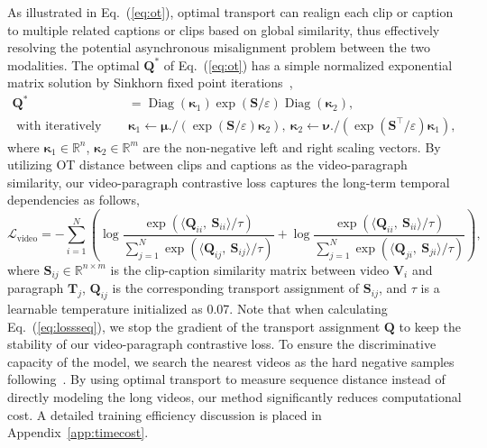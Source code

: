 As illustrated in Eq.~(\ref{eq:ot}), optimal transport can realign each clip or caption to multiple related captions or clips based on global similarity, thus effectively resolving the potential asynchronous misalignment problem between the two modalities. The optimal $\mathbf{Q}^*$ of Eq.~(\ref{eq:ot}) has a simple normalized exponential matrix solution by Sinkhorn fixed point iterations~\citep{sinkhorn}, 
\begin{equation}
\begin{aligned}
	  \mathbf{Q}^* & =  \operatorname{Diag}(\boldsymbol{\kappa}_1) \exp \left({ \mathbf{S}}/{\varepsilon}\right) \operatorname{Diag}(\boldsymbol{\kappa}_2),\\
\text{  with iteratively updated}~&
\boldsymbol{\kappa}_1 \leftarrow \boldsymbol{\mu} . /\left(\exp\left({ {\mathbf{S}}}/{\varepsilon}\right)\boldsymbol{\kappa}_2\right),  ~
\boldsymbol{\kappa}_2 \leftarrow \boldsymbol{\nu} . /\left(\exp\left({\mathbf{S}^{\top}}/{\varepsilon}\right) \boldsymbol{\kappa}_1\right),
\end{aligned}
  \label{eq:q_ot}
\end{equation}
where $\boldsymbol{\kappa}_1 \in \mathbb{R}^n$, $\boldsymbol{\kappa}_2 \in \mathbb{R}^m$ are the non-negative left and right scaling vectors. 
By utilizing OT distance between clips and captions as the video-paragraph similarity, our video-paragraph contrastive loss captures the long-term temporal dependencies as follows,
\begin{equation}
  \mathcal{L}_{\text{video}} = -
    \sum_{i=1}^N
    \left(
  \log \frac{
  \exp \left(\langle\mathbf{Q}_{ii},~\mathbf{S}_{ii}\rangle/ \tau\right)}
  {
  \sum_{j=1}^N \exp \left(\langle
  \mathbf{Q}_{ij},~\mathbf{S}_{ij}\rangle / \tau\right)}
  +
  \log \frac{
  \exp \left(\langle\mathbf{Q}_{ii},~\mathbf{S}_{ii}\rangle/ \tau\right)}
  {
  \sum_{j=1}^N \exp \left(\langle
  \mathbf{Q}_{ji},~\mathbf{S}_{ji}\rangle / \tau\right)}
  \right)
  ,
  \label{eq:lossseq}
\end{equation}
where $\mathbf{S}_{ij}\in \mathbb{R}^{n\times m}$ is the clip-caption similarity matrix between video $\mathbf{V}_i$ and paragraph $\mathbf{T}_j$, $\mathbf{Q}_{ij}$ is the corresponding transport assignment of $\mathbf{S}_{ij}$, and $\tau$ is a learnable temperature initialized as 0.07. Note that when calculating Eq.~(\ref{eq:lossseq}), we stop the gradient of the transport assignment $\mathbf{Q}$ to keep the stability of our video-paragraph contrastive loss. To ensure the discriminative capacity of the model, we search the nearest videos as the hard negative samples following~\cite{videoclip}. By using optimal transport to measure sequence distance instead of directly modeling the long videos, our method significantly reduces computational cost. A detailed training efficiency discussion is placed in Appendix~\ref{app:timecost}.

